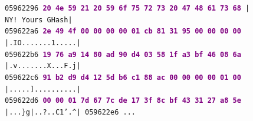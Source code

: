 \documentclass{article}
\begin{document}
\begin{figure}[H]
{    \texttt{05962296 \textbf{\textcolor{purple}{20 4e 59 21 20 59 6f 75  72 73 20 47 48 61 73 68}} | NY! Yours GHash|} \\
    \texttt{059622a6 \textbf{\textcolor{purple}{2e 49 4f 00 00 00 00 01  cb 81 31 95 00 00 00 00}} |.IO.......1.....|} \\
    \texttt{059622b6 \textbf{\textcolor{purple}{19 76 a9 14 80 ad 90 d4  03 58 1f a3 bf 46 08 6a}} |.v.......X...F.j|} \\
    \texttt{059622c6 \textbf{\textcolor{purple}{91 b2 d9 d4 12 5d b6 c1  88 ac 00 00 00 00 01 00}} |.....]..........|} \\
    \texttt{059622d6 \textbf{\textcolor{purple}{00 00 01 7d 67 7c de 17  3f 8c bf 43 31 27 a8 5e}} |...\}g|..?..C1'.\textasciicircum|
    \texttt{059622e6} ...}
    }
    \end{figure}
\end{document}
